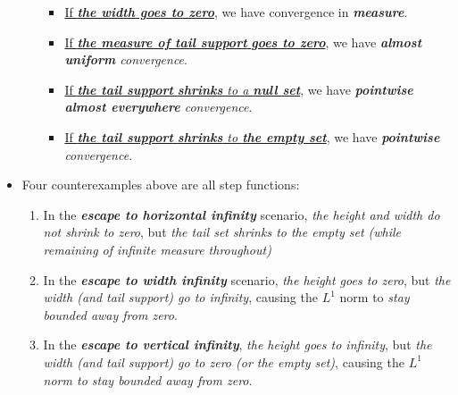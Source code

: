 \documentclass[11pt]{article}
\begin{document}
\begin{itemize}
\begin{remark}
\begin{itemize}
\begin{itemize}
\item \underline{If \emph{\textbf{the width goes to zero}}}, we have convergence in \emph{\textbf{measure}}.

\item \underline{If \emph{\textbf{the measure of tail support}} \emph{\textbf{goes to zero}}}, we have \emph{\textbf{almost uniform} convergence}.

\item \underline{If \emph{\textbf{the tail support} \textbf{shrinks} to a \textbf{null set}}}, we have \emph{\textbf{pointwise almost everywhere} convergence}.

\item \underline{If \emph{\textbf{the tail support} \textbf{shrinks} to \textbf{the empty set}}}, we have \emph{\textbf{pointwise} convergence}. 
\end{itemize}
\end{itemize}
\end{remark}   

\item \begin{remark}
Four counterexamples above are all step functions:
\begin{enumerate}
\item In the \emph{\textbf{escape to horizontal infinity}} scenario, \emph{the height and width do not shrink to zero}, but \emph{the tail set shrinks to the empty set (while remaining of infinite measure throughout)}
\item In the \emph{\textbf{escape to width infinity}} scenario, \emph{the height goes to zero}, but \emph{the width (and tail support) go to infinity}, causing the $L^1$ norm to \emph{stay bounded away from zero}.
\item In the \emph{\textbf{escape to vertical infinity}}, \emph{the height goes to infinity}, but \emph{the width (and tail support) go to zero (or the empty set)}, causing the \emph{$L^1$ norm to stay bounded away from zero}.
\end{enumerate}

\end{remark}
\end{itemize}
\newpage
\end{document}
